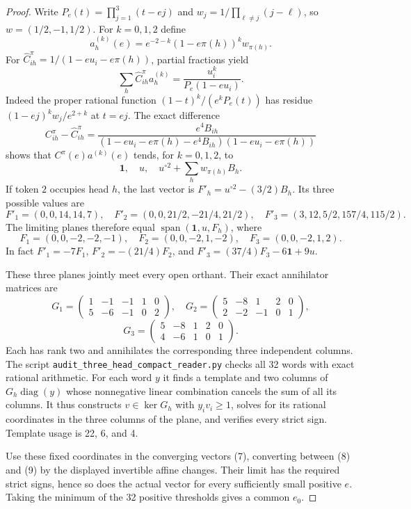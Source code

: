 \documentclass[11pt]{article}
\begin{document}
\begin{proof}
Write $P_e(t)=\prod_{j=1}^3(t-ej)$ and
$w_j=1/\prod_{\ell\ne j}(j-\ell)$, so $w=(1/2,-1,1/2)$.
For $k=0,1,2$ define
\[
 a_h^{(k)}(e)=e^{-2-k}(1-e\pi(h))^k w_{\pi(h)}. \tag{4}
\]
For $\widehat C^\pi_{ih}=1/(1-eu_i-e\pi(h))$, partial fractions yield
\[
 \sum_h\widehat C^\pi_{ih}a_h^{(k)}
 =\frac{u_i^k}{P_e(1-eu_i)}. \tag{5}
\]
Indeed the proper rational function $(1-t)^k/(e^kP_e(t))$ has
residue $(1-ej)^kw_j/e^{2+k}$ at $t=ej$.
The exact difference
\[
 C^\pi_{ih}-\widehat C^\pi_{ih}
 =\frac{e^4B_{ih}}
 {(1-eu_i-e\pi(h)-e^4B_{ih})(1-eu_i-e\pi(h))} \tag{6}
\]
shows that $C^\pi(e)a^{(k)}(e)$ tends, for $k=0,1,2$, to
\[
 \mathbf1,\quad u,\quad u^{\circ2}+\sum_h w_{\pi(h)}B_h. \tag{7}
\]
If token $2$ occupies head $h$, the last vector is
$F'_h=u^{\circ2}-(3/2)B_h$. Its three possible values are
\[
 F'_1=(0,0,14,14,7),\quad
 F'_2=(0,0,21/2,-21/4,21/2),\quad
 F'_3=(3,12,5/2,157/4,115/2). \tag{8}
\]
The limiting planes therefore equal
$\operatorname{span}(\mathbf1,u,F_h)$, where
\[
 F_1=(0,0,-2,-2,-1),\quad
 F_2=(0,0,-2,1,-2),\quad
 F_3=(0,0,-2,1,2). \tag{9}
\]
In fact $F'_1=-7F_1$, $F'_2=-(21/4)F_2$, and
$F'_3=(37/4)F_3-6\mathbf1+9u$.

These three planes jointly meet every open orthant. Their exact
annihilator matrices are
\[
 G_1=\begin{pmatrix}1&-1&-1&1&0\\5&-6&-1&0&2\end{pmatrix},\quad
 G_2=\begin{pmatrix}5&-8&1&2&0\\2&-2&-1&0&1\end{pmatrix},
\]
\[
 G_3=\begin{pmatrix}5&-8&1&2&0\\4&-6&1&0&1\end{pmatrix}. \tag{10}
\]
Each has rank two and annihilates the corresponding three independent
columns. The script \texttt{audit\_three\_head\_compact\_reader.py}
checks all 32 words with exact rational arithmetic. For each word $y$
it finds a template and two columns of $G_h\operatorname{diag}(y)$
whose nonnegative linear combination cancels the sum of all its
columns. It thus constructs $v\in\ker G_h$ with $y_iv_i\geq1$,
solves for its rational coordinates in the three columns of the
plane, and verifies every strict sign. Template usage is 22, 6, and 4.

Use these fixed coordinates in the converging vectors (7), converting
between (8) and (9) by the displayed invertible affine changes.
Their limit has the required strict signs, hence so does the actual
vector for every sufficiently small positive $e$. Taking the minimum
of the 32 positive thresholds gives a common $e_0$.
\end{proof}
\end{document}
